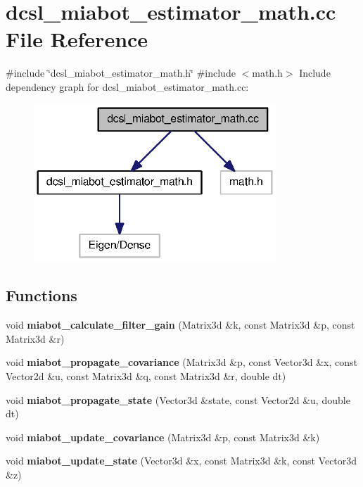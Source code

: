 \section{dcsl\-\_\-miabot\-\_\-estimator\-\_\-math.\-cc \-File \-Reference}
\label{dcsl__miabot__estimator__math_8cc}
{\ttfamily \#include \char`\"{}dcsl\-\_\-miabot\-\_\-estimator\-\_\-math.\-h\char`\"{}}\*
{\ttfamily \#include $<$math.\-h$>$}\*
\-Include dependency graph for dcsl\-\_\-miabot\-\_\-estimator\-\_\-math.\-cc\-:
\nopagebreak
\begin{figure}[H]
\begin{center}
\leavevmode
\includegraphics[width=258pt]{dcsl__miabot__estimator__math_8cc__incl}
\end{center}
\end{figure}
\subsection*{\-Functions}
\begin{DoxyCompactItemize}
\item 
void {\bf miabot\-\_\-calculate\-\_\-filter\-\_\-gain} (\-Matrix3d \&k, const \-Matrix3d \&p, const \-Matrix3d \&r)
\item 
void {\bf miabot\-\_\-propagate\-\_\-covariance} (\-Matrix3d \&p, const \-Vector3d \&x, const \-Vector2d \&u, const \-Matrix3d \&q, const \-Matrix3d \&r, double dt)
\item 
void {\bf miabot\-\_\-propagate\-\_\-state} (\-Vector3d \&state, const \-Vector2d \&u, double dt)
\item 
void {\bf miabot\-\_\-update\-\_\-covariance} (\-Matrix3d \&p, const \-Matrix3d \&k)
\item 
void {\bf miabot\-\_\-update\-\_\-state} (\-Vector3d \&x, const \-Matrix3d \&k, const \-Vector3d \&z)
\end{DoxyCompactItemize}


